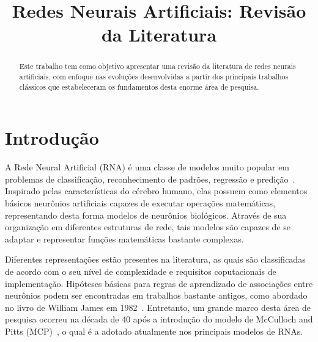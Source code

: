 \documentclass[conference]{IEEEtran}
\begin{document}
	
	\title{Redes Neurais Artificiais: Revisão da Literatura}
	
	
	\author{
		}
	
	
	
	\maketitle
	
	\begin{abstract}
		Este trabalho tem como objetivo apresentar uma revisão da literatura de redes neurais artificiais, com enfoque nas evoluções desenvolvidas a partir dos principais trabalhos clássicos que estabeleceram os fundamentos desta enorme área de pesquisa. 
	\end{abstract}

	\section{Introdução}
	A Rede Neural Artificial (RNA) é uma classe de modelos muito popular em problemas de classificação, reconhecimento de padrões, regressão e predição~\cite{jain1996artificial}. Inspirado pelas características do cérebro humano, elas possuem como elementos básicos neurônios artificiais capazes de executar operações matemáticas, representando desta forma modelos de neurônios biológicos. Através de sua organização em diferentes estruturas de rede, tais modelos são capazes de se adaptar e representar funções matemáticas bastante complexas. 
	
	Diferentes representações estão presentes na literatura, as quais são classificadas de acordo com o seu nível de complexidade e requisitos coputacionais de implementação. Hipóteses básicas para regras de aprendizado de associações entre neurônios podem ser encontradas em trabalhos bastante antigos, como abordado no livro de William James em 1982~\cite{james1984psychology}. Entretanto, um grande marco desta área de pesquisa ocorreu na década de 40 após a introdução do modelo de McCulloch and Pitts (MCP)~\cite{mcculloch1943logical}, o qual é a adotado atualmente nos principais modelos de RNAs.
	
\end{document}
